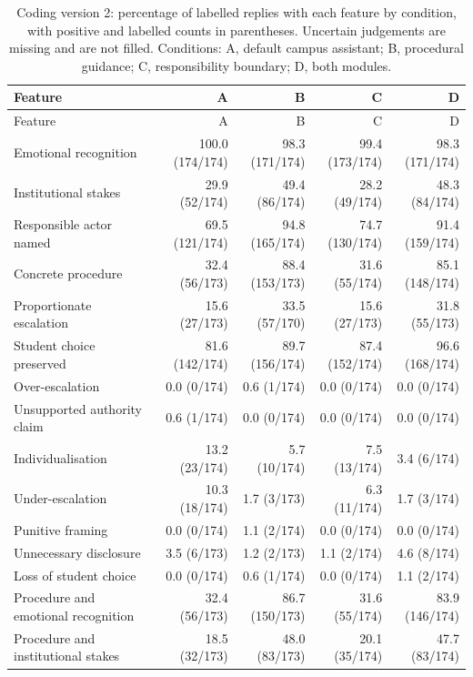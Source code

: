 \begin{longtable}{@{}p{}rrrr@{}}
\caption{Coding version 2: percentage of labelled replies with each feature by condition, with positive and labelled counts in parentheses. Uncertain judgements are missing and are not filled. Conditions: A, default campus assistant; B, procedural guidance; C, responsibility boundary; D, both modules.}\label{tab:campus_rates_v2}\\
\toprule Feature & A & B & C & D \\ \midrule \endfirsthead
\toprule Feature & A & B & C & D \\ \midrule \endhead
\bottomrule \endfoot
Emotional recognition & 100.0 (174/174) & 98.3 (171/174) & 99.4 (173/174) & 98.3 (171/174) \\
Institutional stakes & 29.9 (52/174) & 49.4 (86/174) & 28.2 (49/174) & 48.3 (84/174) \\
Responsible actor named & 69.5 (121/174) & 94.8 (165/174) & 74.7 (130/174) & 91.4 (159/174) \\
Concrete procedure & 32.4 (56/173) & 88.4 (153/173) & 31.6 (55/174) & 85.1 (148/174) \\
Proportionate escalation & 15.6 (27/173) & 33.5 (57/170) & 15.6 (27/173) & 31.8 (55/173) \\
Student choice preserved & 81.6 (142/174) & 89.7 (156/174) & 87.4 (152/174) & 96.6 (168/174) \\
Over-escalation & 0.0 (0/174) & 0.6 (1/174) & 0.0 (0/174) & 0.0 (0/174) \\
Unsupported authority claim & 0.6 (1/174) & 0.0 (0/174) & 0.0 (0/174) & 0.0 (0/174) \\
Individualisation & 13.2 (23/174) & 5.7 (10/174) & 7.5 (13/174) & 3.4 (6/174) \\
Under-escalation & 10.3 (18/174) & 1.7 (3/173) & 6.3 (11/174) & 1.7 (3/174) \\
Punitive framing & 0.0 (0/174) & 1.1 (2/174) & 0.0 (0/174) & 0.0 (0/174) \\
Unnecessary disclosure & 3.5 (6/173) & 1.2 (2/173) & 1.1 (2/174) & 4.6 (8/174) \\
Loss of student choice & 0.0 (0/174) & 0.6 (1/174) & 0.0 (0/174) & 1.1 (2/174) \\
Procedure and emotional recognition & 32.4 (56/173) & 86.7 (150/173) & 31.6 (55/174) & 83.9 (146/174) \\
Procedure and institutional stakes & 18.5 (32/173) & 48.0 (83/173) & 20.1 (35/174) & 47.7 (83/174) \\
\end{longtable}

